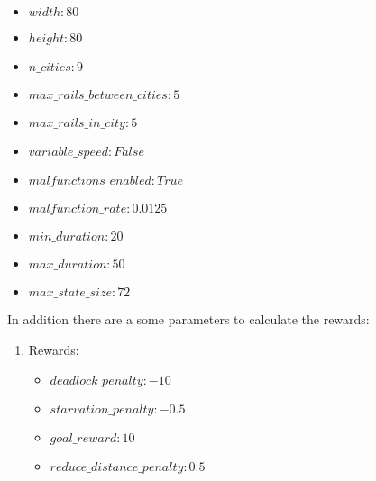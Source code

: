 \begin{enumerate}
\begin{itemize}
		\item $width: 80 $
		\item $height: 80 $
		\item $n\_cities: 9 $
		\item $max\_rails\_between\_cities: 5 $
		\item $max\_rails\_in\_city: 5 $
		\item  $variable\_speed: False $
		\item $malfunctions\_enabled: True $
		\item $malfunction\_rate: 0.0125 $
		\item $min\_duration: 20 $
		\item $max\_duration: 50 $
		\item $max\_state\_size: 72$
	\end{itemize}
\end{enumerate}
In addition there are a some parameters to calculate the rewards:
\begin{enumerate}
	\item Rewards:
	\begin{itemize}
		\item $deadlock\_penalty: -10$
		\item $starvation\_penalty: -0.5$
		\item $goal\_reward: 10$
		\item $reduce\_distance\_penalty: 0.5$
	\end{itemize}
\end{enumerate}
